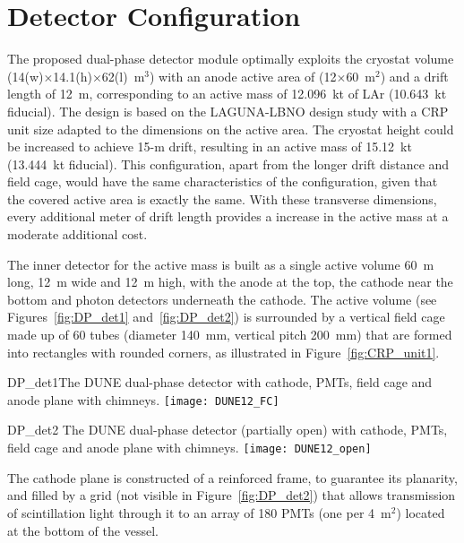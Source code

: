 \section{Detector Configuration}

\begin{sloppypar}
The proposed dual-phase detector module optimally exploits the
cryostat volume (14(w)$\times$14.1(h)$\times$62(l)~m$^3$) with an
anode active area of (12$\times$60~m$^2$) and a drift length of 12~m,
corresponding to an active mass of 12.096~kt of LAr (10.643~kt
fiducial). The design is based on the  LAGUNA-LBNO design study
with a CRP unit size adapted to the dimensions on the active area. The
cryostat height could be increased to achieve 15-m drift, resulting in
an active mass of 15.12~kt (13.444~kt fiducial).  This 
configuration, apart from the longer drift distance and field cage,
would have the same characteristics of the  configuration,
given that the covered active area is exactly the same. With these
transverse dimensions, every additional meter of drift length provides
a  increase in the active mass at a moderate additional cost.
\end{sloppypar}

The inner detector for the  active mass is built as a single
active volume 60~m long, 12~m wide and 12~m high, with the anode at the
top, the cathode near the bottom and photon detectors underneath the cathode. The active volume
(see Figures~\ref{fig:DP_det1} and~\ref{fig:DP_det2}) is surrounded by
a vertical field cage made up of 60 %
tubes (diameter 140~mm, %
vertical pitch 200~mm) that are formed into rectangles with rounded corners, as illustrated
in Figure~\ref{fig:CRP_unit1}.
\begin{cdrfigure}{DP_det1}{The DUNE dual-phase 
detector with cathode, PMTs, field cage and anode plane with chimneys.}
\texttt{[image: DUNE12\_FC]}
\end{cdrfigure}
\begin{cdrfigure}{DP_det2}
{The DUNE dual-phase detector (partially open) with cathode, PMTs, field cage and anode plane with chimneys.}
\texttt{[image: DUNE12\_open]}
\end{cdrfigure}

The cathode plane %
is constructed of a reinforced frame, to
guarantee its planarity, and filled by a %
grid (not visible in
Figure~\ref{fig:DP_det2}) 
that allows transmission of %
scintillation light through it to %
an array of 180 PMTs (one per 4~m$^2$)
located at the bottom of the vessel.

